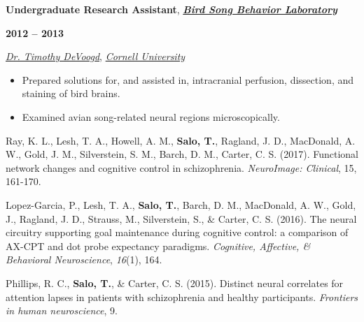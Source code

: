 \documentclass[10pt]{article}
\newcommand{\sectionstyle}{\LARGE \fontfamily{pcr}\selectfont}
\begin{document}
\bigskip

\begin{minipage}[t]{.85\linewidth}
\flushleft
\noindent
\textbf{Undergraduate Research Assistant},
\href{http://people.psych.cornell.edu/~devoogdlab/}{\emph{\textbf{Bird Song Behavior Laboratory}}}
\end{minipage}
\hfill
\begin{minipage}[t]{.15\linewidth}
\flushright
\noindent
\textsc{\textbf{2012 -- 2013}}
\end{minipage}

\href{http://www.psych.cornell.edu/people/faculty/devoogd-profile/}{\emph{Dr. Timothy DeVoogd}},
\href{http://www.cornell.edu}{\emph{Cornell University}}

\begin{itemize}[noitemsep, nolistsep]
\item
  Prepared solutions for, and assisted in, intracranial perfusion,
  dissection, and staining of bird brains.
\item
  Examined avian song-related neural regions microscopically.
\end{itemize}

\newpage

\begin{center}\sectionstyle{PUBLICATIONS}\end{center}

\begin{hangparas}{.25in}{1}
Ray, K. L., Lesh, T. A., Howell, A. M., \textbf{Salo, T.}, Ragland, J. D.,
MacDonald, A. W., Gold, J. M., Silverstein, S. M., Barch, D. M., Carter,
C. S. (2017). Functional network changes and cognitive control in schizophrenia.
\emph{NeuroImage: Clinical}, 15, 161-170.

\bigskip

Lopez-Garcia, P., Lesh, T. A., \textbf{Salo, T.}, Barch, D. M., MacDonald,
A. W., Gold, J., Ragland, J. D., Strauss, M., Silverstein, S., \& Carter, C. S.
(2016). The neural circuitry supporting goal maintenance during cognitive
control: a comparison of AX-CPT and dot probe expectancy paradigms.
\emph{Cognitive, Affective, \& Behavioral Neuroscience}, \emph{16}(1), 164.

\bigskip

Phillips, R. C., \textbf{Salo, T.}, \& Carter, C. S. (2015). Distinct neural
correlates for attention lapses in patients with schizophrenia and healthy
participants. \emph{Frontiers in human neuroscience}, 9.
\end{hangparas}
\end{document}
